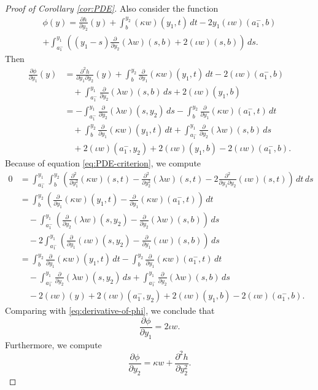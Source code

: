 \documentclass[a4paper]{article}
\newcommand{\dd}[2]{\frac{\partial #1}{\partial #2}}
\theoremstyle{definition}
\theoremstyle{remark}
\begin{document}
\begin{proof}[Proof of Corollary \ref{cor:PDE}]
Also consider the function
\begin{multline*}
\phi(y) = \dd{h}{y_2}(y) + \int_b^{y_2} (\kappa w)(y_1, t) \, dt - 2y_1 (\iota w)(a_1^-, b)\\
+ \int_{a_1^-}^{y_1} \left((y_1 - s) \dd{}{y_2} (\lambda w)(s, b) + 2 (\iota w)(s, b)\right) \, ds.
\end{multline*}
Then
\begin{equation} \label{eq:derivative-of-phi}
\begin{split}
\dd{\phi}{y_1}(y) & = \frac{\partial^2 h}{\partial y_1 \partial y_2}(y) + \int_b^{y_2} \dd{}{y_1}(\kappa w)(y_1, t) \, dt - 2(\iota w)(a_1^-, b) \\
& \quad + \int_{a_1^-}^{y_1} \dd{}{y_2}(\lambda w)(s, b) \, ds + 2(\iota w)(y_1, b) \\
& = - \int_{a_1^-}^{y_1} \dd{}{y_2}(\lambda w)(s, y_2) \, ds - \int_b^{y_2} \dd{}{y_1}(\kappa w)(a_1^-, t) \, dt \\
& \quad + \int_b^{y_2} \dd{}{y_1}(\kappa w)(y_1, t) \, dt + \int_{a_1^-}^{y_1} \dd{}{y_2}(\lambda w)(s, b) \, ds \\
& \quad + 2(\iota w)(a_1^-, y_2) + 2(\iota w)(y_1, b) - 2(\iota w)(a_1^-, b).
\end{split}
\end{equation}
Because of equation \eqref{eq:PDE-criterion}, we compute
\[
\begin{split}
0 & = \int_{a_1^-}^{y_1} \int_b^{y_2} \left(\frac{\partial^2}{\partial y_1^2}(\kappa w)(s, t) - \frac{\partial^2}{\partial y_2^2}(\lambda w)(s, t) - 2\frac{\partial^2}{\partial y_1 \partial y_2}(\iota w)(s, t)\right) \, dt \, ds \\
& = \int_b^{y_2} \left(\dd{}{y_1}(\kappa w)(y_1, t) - \dd{}{y_1}(\kappa w)(a_1^-, t)\right) \, dt \\
& \quad - \int_{a_1^-}^{y_1} \left(\dd{}{y_2}(\lambda w)(s, y_2) - \dd{}{y_2}(\lambda w)(s, b)\right) \, ds \\
& \quad - 2\int_{a_1^-}^{y_1} \left(\dd{}{y_1}(\iota w)(s, y_2) - \dd{}{y_1}(\iota w)(s, b)\right) \, ds \\
& = \int_b^{y_2} \dd{}{y_1}(\kappa w)(y_1, t) \, dt - \int_b^{y_2} \dd{}{y_1}(\kappa w)(a_1^-, t) \, dt \\
& \quad - \int_{a_1^-}^{y_1} \dd{}{y_2}(\lambda w)(s, y_2) \, ds + \int_{a_1^-}^{y_1} \dd{}{y_2}(\lambda w)(s, b) \, ds \\
& \quad - 2(\iota w)(y) + 2(\iota w)(a_1^-, y_2) + 2(\iota w)(y_1, b) - 2(\iota w)(a_1^-, b).
\end{split}
\]
Comparing with \eqref{eq:derivative-of-phi}, we conclude that
\[
\dd{\phi}{y_1} = 2\iota w.
\]
Furthermore, we compute
\[
\dd{\phi}{y_2} = \kappa w + \frac{\partial^2 h}{\partial y_2^2}.
\]


\end{proof}
\end{document}
